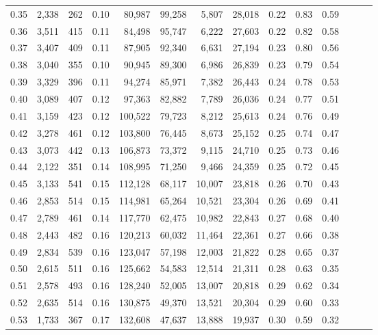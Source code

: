 \begin{tabular}{rrrrrrrrrrrrrr}
0.35 &  2,338 &  262 &  0.10 &   80,987 &   99,258 &   5,807 &  28,018 &  0.22 &  0.83 &      0.59 \\
0.36 &  3,511 &  415 &  0.11 &   84,498 &   95,747 &   6,222 &  27,603 &  0.22 &  0.82 &      0.58 \\
0.37 &  3,407 &  409 &  0.11 &   87,905 &   92,340 &   6,631 &  27,194 &  0.23 &  0.80 &      0.56 \\
0.38 &  3,040 &  355 &  0.10 &   90,945 &   89,300 &   6,986 &  26,839 &  0.23 &  0.79 &      0.54 \\
0.39 &  3,329 &  396 &  0.11 &   94,274 &   85,971 &   7,382 &  26,443 &  0.24 &  0.78 &      0.53 \\
0.40 &  3,089 &  407 &  0.12 &   97,363 &   82,882 &   7,789 &  26,036 &  0.24 &  0.77 &      0.51 \\
0.41 &  3,159 &  423 &  0.12 &  100,522 &   79,723 &   8,212 &  25,613 &  0.24 &  0.76 &      0.49 \\
0.42 &  3,278 &  461 &  0.12 &  103,800 &   76,445 &   8,673 &  25,152 &  0.25 &  0.74 &      0.47 \\
0.43 &  3,073 &  442 &  0.13 &  106,873 &   73,372 &   9,115 &  24,710 &  0.25 &  0.73 &      0.46 \\
0.44 &  2,122 &  351 &  0.14 &  108,995 &   71,250 &   9,466 &  24,359 &  0.25 &  0.72 &      0.45 \\
0.45 &  3,133 &  541 &  0.15 &  112,128 &   68,117 &  10,007 &  23,818 &  0.26 &  0.70 &      0.43 \\
0.46 &  2,853 &  514 &  0.15 &  114,981 &   65,264 &  10,521 &  23,304 &  0.26 &  0.69 &      0.41 \\
0.47 &  2,789 &  461 &  0.14 &  117,770 &   62,475 &  10,982 &  22,843 &  0.27 &  0.68 &      0.40 \\
0.48 &  2,443 &  482 &  0.16 &  120,213 &   60,032 &  11,464 &  22,361 &  0.27 &  0.66 &      0.38 \\
0.49 &  2,834 &  539 &  0.16 &  123,047 &   57,198 &  12,003 &  21,822 &  0.28 &  0.65 &      0.37 \\
0.50 &  2,615 &  511 &  0.16 &  125,662 &   54,583 &  12,514 &  21,311 &  0.28 &  0.63 &      0.35 \\
0.51 &  2,578 &  493 &  0.16 &  128,240 &   52,005 &  13,007 &  20,818 &  0.29 &  0.62 &      0.34 \\
0.52 &  2,635 &  514 &  0.16 &  130,875 &   49,370 &  13,521 &  20,304 &  0.29 &  0.60 &      0.33 \\
0.53 &  1,733 &  367 &  0.17 &  132,608 &   47,637 &  13,888 &  19,937 &  0.30 &  0.59 &      0.32 \\

\end{tabular}
